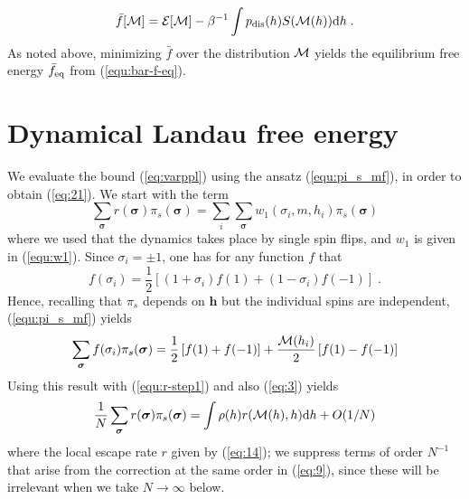 \documentclass{iopart}
\newcommand{\eqref}[1]{(\ref{#1})}
\newcommand{\dst}[0]{\ensuremath{\mathrm{d}}}
\begin{document}
\begin{equation}
  \label{eq:38}
      \bar{f}[{\cal M}] = {\cal E}[{\cal M}] - \beta^{-1} \int p_{\rm dis}(h) S({\cal M}(h)) \mathrm{d}h \; .
\end{equation}
As noted above, minimizing $\bar{f}$ over the distribution ${\cal M}$ yields the equilibrium free energy $\bar{f}_{\rm eq}$ from (\ref{equ:bar-f-eq}).

\section{Dynamical Landau free energy}
\label{app:dyn_free_energy}

We evaluate the bound (\ref{eq:varppl}) using the ansatz (\ref{equ:pi_s_mf}), in order to obtain (\ref{eq:21}).  We start with the term
\begin{equation}
\sum_{\bm{\sigma}} r(\bm{\sigma}) \pi_s(\bm{\sigma}) = \sum_i \sum_{\bm{\sigma}}   w_1(\sigma_i,m,h_i) \pi_s(\bm{\sigma})
\label{equ:r-step1}
\end{equation}
where we used that the dynamics takes place by single spin flips, and $w_1$ is given in  (\ref{equ:w1}).  Since $\sigma_i=\pm 1$, one has for any function $f$ that 
\begin{equation}
f(\sigma_i)=\frac12 \left[ (1+\sigma_i) f(1) + (1-\sigma_i)f(-1)\right] \;.
\end{equation}
  Hence, recalling that $\pi_s$ depends on $\bm{h}$ but the individual spins are independent, (\ref{equ:pi_s_mf}) yields
\begin{equation}
\sum_{\bm{\sigma}}  f(\sigma_i) \pi_s(\bm{\sigma}) = \frac12 \left[ f(1)+f(-1) \right] + \frac{ {\cal M}(h_i) }{2} \left[ f(1)-f(-1) \right] 
\end{equation}
Using this result with (\ref{equ:r-step1}) and also (\ref{eq:3}) yields 
\begin{equation}
\frac{1}{N}  \sum_{\bm{\sigma}} r(\bm{\sigma}) \pi_s(\bm{\sigma}) = \int \rho(h) r({\cal M}(h),h) \dst h + O(1/N)
\label{equ:r-step2}
\end{equation}
where the local escape rate $r$ given by (\ref{eq:14}); we suppress terms of order $N^{-1}$ that arise from the  correction at the same order in (\ref{eq:9}), since these will be irrelevant when we take $N\to\infty$ below.
\end{document}
